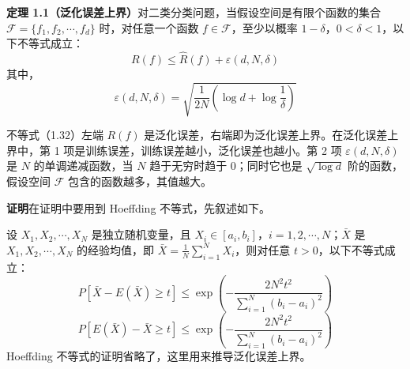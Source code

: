 \documentclass[UTF8, 12pt, fontset=fandol, oneside]{ctexart}
\begin{document}
\noindent\textbf{定理 1.1（泛化误差上界）}\quad 对二类分类问题，当假设空间是有限个函数的集合 $\mathcal F=\{f_1,f_2,\cdots,f_d\}$ 时，对任意一个函数 $f\in\mathcal F$，至少以概率 $1-\delta$，$0<\delta<1$，以下不等式成立：
\begin{equation}
  R(f)\le\hat R(f)+\varepsilon(d,N,\delta)
  \tag{1.32}
\end{equation}
其中，
\begin{equation}
  \varepsilon(d,N,\delta)=\sqrt{\frac1{2N}\left(\log d+\log\frac1\delta\right)}
  \tag{1.33}
\end{equation}

不等式（1.32）左端 $R(f)$ 是泛化误差，右端即为泛化误差上界。在泛化误差上界中，第 1 项是训练误差，训练误差越小，泛化误差也越小。第 2 项 $\varepsilon(d,N,\delta)$ 是 $N$ 的单调递减函数，当 $N$ 趋于无穷时趋于 0；同时它也是 $\sqrt{\log d}$ 阶的函数，假设空间 $\mathcal F$ 包含的函数越多，其值越大。

\noindent\textbf{证明}\quad 在证明中要用到 Hoeffding 不等式，先叙述如下。

设 $X_1,X_2,\cdots,X_N$ 是独立随机变量，且 $X_i\in[a_i,b_i]$，$i=1,2,\cdots,N$；$\bar X$ 是 $X_1,X_2,\cdots,X_N$ 的经验均值，即 $\bar X=\frac1N\sum_{i=1}^N X_i$，则对任意 $t>0$，以下不等式成立：
\begin{equation}
  P[\bar X-E(\bar X)\ge t]\le
  \exp\left(-\frac{2N^2t^2}{\sum_{i=1}^N(b_i-a_i)^2}\right)
  \tag{1.34}
\end{equation}
\begin{equation}
  P[E(\bar X)-\bar X\ge t]\le
  \exp\left(-\frac{2N^2t^2}{\sum_{i=1}^N(b_i-a_i)^2}\right)
  \tag{1.35}
\end{equation}
Hoeffding 不等式的证明省略了，这里用来推导泛化误差上界。
\end{document}
